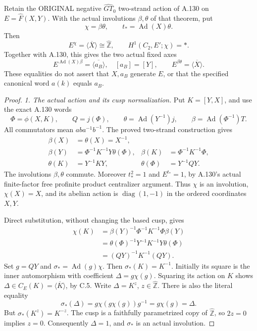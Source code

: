 Retain the ORIGINAL negative \(\widehat{GT}_0\) two-strand action
of A.130 on \(E=\widehat F(X,Y)\). With the actual involutions
\(\beta,\theta\) of that theorem, put
\[
 \chi=\beta\theta,\qquad t_*=\operatorname{Ad}(X)\theta .
\]
Then
\[
 E^\chi=\overline{\langle X\rangle}\cong\widehat{\mathbb Z},
 \qquad H^1(C_2,E';\chi)=* .
 \tag{A.136.1}
\]
Together with A.130, this gives the two actual fixed axes
\[
 E^{\operatorname{Ad}(X)\beta}
       =\overline{\langle a_B\rangle},\quad [a_B]=[Y],
 \qquad E^{\beta\theta}=\overline{\langle X\rangle}.
 \tag{A.136.2}
\]
These equalities do not assert that \(X,a_B\) generate \(E\), or that
the specified canonical word \(a(k)\) equals \(a_B\).
\begin{proof}
\emph{1. The actual action and its cusp normalization.}
Put \(K=[Y,X]\), and use the exact A.130 words
\[
 \Phi=\phi(X,K),\qquad Q=j(\Phi),\qquad
 \theta=\operatorname{Ad}(Y^{-1})j,\qquad
 \beta=\operatorname{Ad}(\Phi^{-1})T .
\]
All commutators mean \(aba^{-1}b^{-1}\). The proved two-strand
construction gives
\[
\begin{aligned}
 \beta(X)&=\theta(X)=X^{-1},\\
 \beta(Y)&=\Phi^{-1}K^{-1}Y\theta(\Phi),&
 \beta(K)&=\Phi^{-1}K^{-1}\Phi,\\
 \theta(K)&=Y^{-1}KY,&
 \theta(\Phi)&=Y^{-1}QY.
\end{aligned}
\tag{A.136.3}
\]
The involutions \(\beta,\theta\) commute. Moreover \(t_*^2=1\)
and \(E^{t_*}=1\), by A.130's actual finite-factor free profinite
product centralizer argument. Thus \(\chi\) is an involution,
\(\chi(X)=X\), and its abelian action is
\(\operatorname{diag}(1,-1)\) in the ordered coordinates \(X,Y\).

Direct substitution, without changing the based cusp, gives
\[
\begin{aligned}
 \chi(K)
 &=\beta(Y)^{-1}\Phi^{-1}K^{-1}\Phi\beta(Y)\\
 &=\theta(\Phi)^{-1}Y^{-1}K^{-1}Y\theta(\Phi)\\
 &=(QY)^{-1}K^{-1}(QY).
\end{aligned}
\tag{A.136.4}
\]
Set \(g=QY\) and \(\sigma_*=\operatorname{Ad}(g)\chi\).
Then \(\sigma_*(K)=K^{-1}\). Initially its square is the inner
automorphism with coefficient \(\Delta=g\chi(g)\).
Squaring its action on \(K\) shows
\(\Delta\in C_E(K)=\overline{\langle K\rangle}\), by C.5.
Write \(\Delta=K^z\), \(z\in\widehat{\mathbb Z}\).
There is also the literal equality
\[
 \sigma_*(\Delta)
 =g\chi(g\chi(g))g^{-1}=g\chi(g)=\Delta.
\]
But \(\sigma_*(K^z)=K^{-z}\). The cusp is a faithfully
parametrized copy of \(\widehat{\mathbb Z}\), so \(2z=0\)
implies \(z=0\). Consequently \(\Delta=1\), and
\(\sigma_*\) is an actual involution.


\end{proof}
